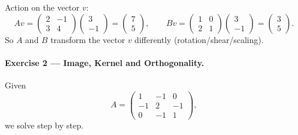 \documentclass[11pt]{article}
\begin{document}
Action on the vector $v$:
\[
Av =
\begin{pmatrix}2 & -1 \\ 3 & 4\end{pmatrix}
\begin{pmatrix}3 \\ -1\end{pmatrix}
=
\begin{pmatrix}7 \\ 5\end{pmatrix},\qquad
Bv =
\begin{pmatrix}1 & 0 \\ 2 & 1\end{pmatrix}
\begin{pmatrix}3 \\ -1\end{pmatrix}
=
\begin{pmatrix}3 \\ 5\end{pmatrix}.
\]
So $A$ and $B$ transform the vector $v$ differently (rotation/shear/scaling).

\bigskip


\paragraph{Exercise 2 — Image, Kernel and Orthogonality.}

Given
\[
A=\begin{pmatrix}
1 & -1 & 0 \\
-1 & 2 & -1 \\
0 & -1 & 1
\end{pmatrix},
\]
we solve step by step.
\end{document}
